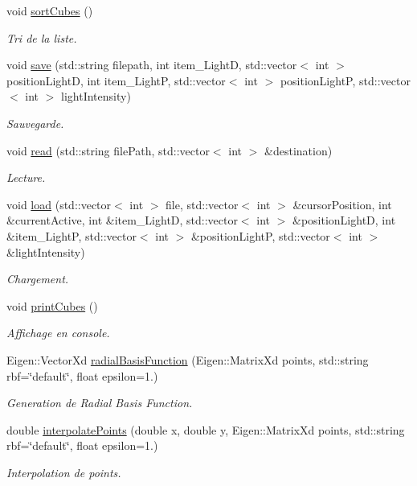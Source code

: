 \begin{DoxyCompactItemize}
void \hyperlink{classglimac_1_1CubeList_af6615c0db1a97fcae5df6f27de71b6d8}{sort\+Cubes} ()
\begin{DoxyCompactList}\small\item\em Tri de la liste. \end{DoxyCompactList}\item 
void \hyperlink{classglimac_1_1CubeList_a2224458162725108e1451f76c2fc8aac}{save} (std\+::string filepath, int item\+\_\+\+LightD, std\+::vector$<$ int $>$ position\+LightD, int item\+\_\+\+LightP, std\+::vector$<$ int $>$ position\+LightP, std\+::vector$<$ int $>$ light\+Intensity)
\begin{DoxyCompactList}\small\item\em Sauvegarde. \end{DoxyCompactList}\item 
void \hyperlink{classglimac_1_1CubeList_a59d87cac2e218d617940ccdab5235b31}{read} (std\+::string file\+Path, std\+::vector$<$ int $>$ \&destination)
\begin{DoxyCompactList}\small\item\em Lecture. \end{DoxyCompactList}\item 
void \hyperlink{classglimac_1_1CubeList_a09a9aede4ef7d31c9721b88fa575d3c6}{load} (std\+::vector$<$ int $>$ file, std\+::vector$<$ int $>$ \&cursor\+Position, int \&current\+Active, int \&item\+\_\+\+LightD, std\+::vector$<$ int $>$ \&position\+LightD, int \&item\+\_\+\+LightP, std\+::vector$<$ int $>$ \&position\+LightP, std\+::vector$<$ int $>$ \&light\+Intensity)
\begin{DoxyCompactList}\small\item\em Chargement. \end{DoxyCompactList}\item 
void \hyperlink{classglimac_1_1CubeList_a5c3e997708642903eb6b4c806de0cdf9}{print\+Cubes} ()
\begin{DoxyCompactList}\small\item\em Affichage en console. \end{DoxyCompactList}\item 
Eigen\+::\+Vector\+Xd \hyperlink{classglimac_1_1CubeList_a538bbaae516f90563e233ef4b183c772}{radial\+Basis\+Function} (Eigen\+::\+Matrix\+Xd points, std\+::string rbf=\char`\"{}default\char`\"{}, float epsilon=1.)
\begin{DoxyCompactList}\small\item\em Generation de Radial Basis Function. \end{DoxyCompactList}\item 
double \hyperlink{classglimac_1_1CubeList_ac4b12134064f67c17192b9c81796792e}{interpolate\+Points} (double x, double y, Eigen\+::\+Matrix\+Xd points, std\+::string rbf=\char`\"{}default\char`\"{}, float epsilon=1.)
\begin{DoxyCompactList}\small\item\em Interpolation de points. \end{DoxyCompactList}\end{DoxyCompactItemize}


